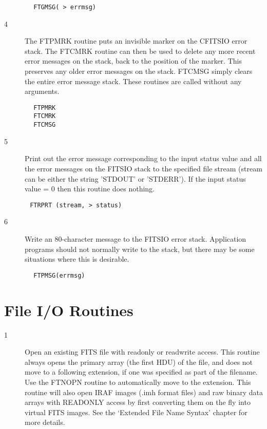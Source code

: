 \documentclass[11pt]{book}
\begin{document}
\begin{verbatim}
        FTGMSG( > errmsg)
\end{verbatim}

\begin{description}
\item[4 ]The FTPMRK routine puts an invisible marker on the
   CFITSIO error stack.  The FTCMRK routine can then be
   used to delete any more recent error messages on the stack, back to
   the position of the marker.  This preserves any older error messages
   on the stack.  FTCMSG simply clears the entire error message stack.
  These routines are called without any arguments.
\end{description}

\begin{verbatim}
        FTPMRK
        FTCMRK
        FTCMSG
\end{verbatim}


\begin{description}
\item[5 ] Print out the error message corresponding to the input status
    value and all the error messages on the FITSIO stack  to the specified
    file stream  (stream can be either the string 'STDOUT' or 'STDERR').
   If the input status value = 0 then this routine does nothing.
\end{description}

\begin{verbatim}
       FTRPRT (stream, > status)
\end{verbatim}

\begin{description}
\item[6 ] Write an 80-character message to the FITSIO error stack.  Application
    programs should not normally write to the stack, but there may be
   some situations where this is desirable.
\end{description}

\begin{verbatim}
        FTPMSG(errmsg)
\end{verbatim}


\section{File I/O Routines}


\begin{description}
\item[1 ]Open an existing FITS file with readonly or readwrite access.
   This routine always opens the primary array (the first HDU) of
   the file, and does not move to a following extension, if one was
   specified as part of the filename.   Use the FTNOPN routine to
   automatically move to the extension.  This routine will also
   open IRAF images (.imh format files) and raw binary data arrays
   with READONLY access by first converting them on the fly into
   virtual FITS images.  See the `Extended File Name Syntax' chapter
  for more details.
\end{description}
\end{document}
